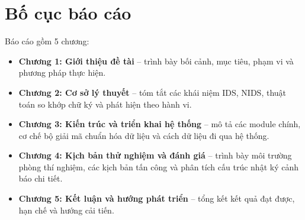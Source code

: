 \section{Bố cục báo cáo}
Báo cáo gồm 5 chương:
\begin{itemize}
    \item \textbf{Chương 1: Giới thiệu đề tài} -- trình bày bối cảnh, mục tiêu, phạm vi và phương pháp thực hiện.
    \item \textbf{Chương 2: Cơ sở lý thuyết} -- tóm tắt các khái niệm IDS, NIDS, thuật toán so khớp chữ ký và phát hiện theo hành vi.
    \item \textbf{Chương 3: Kiến trúc và triển khai hệ thống} -- mô tả các module chính, cơ chế bộ giải mã chuẩn hóa dữ liệu và cách dữ liệu đi qua hệ thống.
    \item \textbf{Chương 4: Kịch bản thử nghiệm và đánh giá} -- trình bày môi trường phòng thí nghiệm, các kịch bản tấn công và phân tích cấu trúc nhật ký cảnh báo chi tiết.
    \item \textbf{Chương 5: Kết luận và hướng phát triển} -- tổng kết kết quả đạt được, hạn chế và hướng cải tiến.
\end{itemize}
